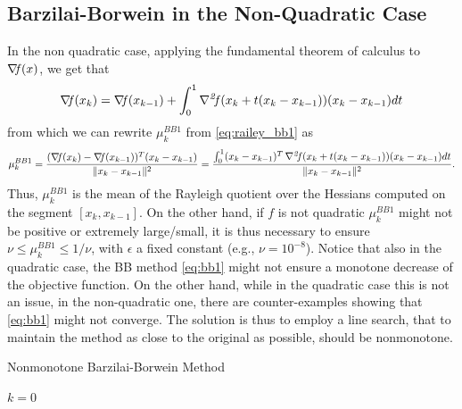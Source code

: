 \documentclass[10pt,a4paper]{article}
\begin{document}
\subsection{Barzilai-Borwein in the Non-Quadratic Case}
In the non quadratic case, applying the fundamental theorem of calculus to $\operatorname*{\mathit{\nabla \!f}}(x)$, we get that
\begin{equation*}
\operatorname*{\mathit{\nabla \!f}}(x_k)=\operatorname*{\mathit{\nabla \!f}}(x_{k-1}) + \int_{0}^{1} \operatorname*{\mathit{\nabla^2 \!f}}(x_k+t(x_k-x_{k-1})) (x_k-x_{k-1}) dt
\end{equation*} 
from which we can rewrite $\mu_k^{BB1}$ from \eqref{eq:railey_bb1} as
\begin{equation*}
	\mu_k^{BB1} = \frac{(\operatorname*{\mathit{\nabla \!f}}(x_k)-\operatorname*{\mathit{\nabla \!f}}(x_{k-1}))^T(x_k-x_{k-1})}{\|x_k - x_{k-1}\|^2} = \frac{\int_{0}^{1}(x_k-x_{k-1})^T \operatorname*{\mathit{\nabla^2 \!f}}(x_k+t(x_k-x_{k-1})) (x_k-x_{k-1}) dt }{\|x_k - x_{k-1}\|^2}.
\end{equation*}
Thus, $\mu_k^{BB1}$ is the mean of the Rayleigh quotient over the Hessians computed on the segment $[x_k, x_{k-1}]$. On the other hand, if $f$ is not quadratic $\mu_k^{BB1}$ might not be positive or extremely large/small, it is thus necessary to ensure $\nu\leq \mu_k^{BB1}\leq 1/\nu$, with $\epsilon$ a fixed constant (e.g., $\nu=10^{-8}$). Notice that also in the quadratic case, the BB method \eqref{eq:bb1} might not ensure a monotone decrease of the objective function. On the other hand, while in the quadratic case this is not an issue, in the non-quadratic one, there are counter-examples showing that \eqref{eq:bb1} might not converge. The solution is thus to employ a line search, that to maintain the method as close to the original as possible, should be nonmonotone. 
\begin{algorithm}[H]\label{alg:bb}
	\caption{Nonmonotone Barzilai-Borwein Method}
	
	
	$k = 0$
	
\end{algorithm}






\end{document}

